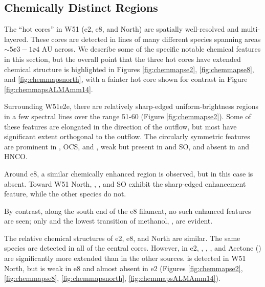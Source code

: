 \documentclass{emulateapj}
\begin{document}

\subsection{Chemically Distinct Regions}
\label{sec:chemistrymaps}
\label{sec:chemistrymapsobs}
The ``hot cores'' in W51 (e2, e8, and North) are spatially well-resolved and
multi-layered.  These cores are detected in lines of many different species
spanning areas $\sim5\ee{3}-1\ee{4}$ AU across.  We describe some of the
specific notable chemical features in this section, but the overall point that
the three hot cores have extended chemical structure is highlighted in Figures
\ref{fig:chemmapse2}, \ref{fig:chemmapse8}, and \ref{fig:chemmapsnorth}, with a
fainter hot core shown for contrast in Figure \ref{fig:chemmapsALMAmm14}.

Surrounding W51e2e, there are relatively sharp-edged uniform-brightness regions
in a few spectral lines over the range 51-60 \kms (Figure
\ref{fig:chemmapse2}).  Some of these features are elongated in the direction
of the outflow, but most have significant extent orthogonal to the outflow.
The circularly symmetric features are prominent in \methanol, OCS, and
\dimethylether, weak but present in \formaldehyde and SO, and absent in
\cyanoacetylene and HNCO.

Around e8, a similar chemically enhanced region is observed, but in this case
\dimethylether is absent.  Toward W51 North, \methanol, \formaldehyde, and SO
exhibit the sharp-edged enhancement feature, while the other species do not.

By contrast, along the south end of the e8 filament, no such enhanced features
are seen; only \formaldehyde and the lowest transition of methanol, \methanol
\fourtwotwo, are evident.

The relative chemical structures of e2, e8, and North are  similar.
The same species are detected in all of the central cores.  However, in e2,
\dimethylether, \methylformate, \ethylcyanide, and Acetone (\acetone) are
significantly more extended than in the other sources.
\gaucheethanol is detected in W51 North, but is weak in e8 and almost absent
in e2 (Figures \ref{fig:chemmapse2}, \ref{fig:chemmapse8},
\ref{fig:chemmapsnorth}, \ref{fig:chemmapsALMAmm14}).
\end{document}
